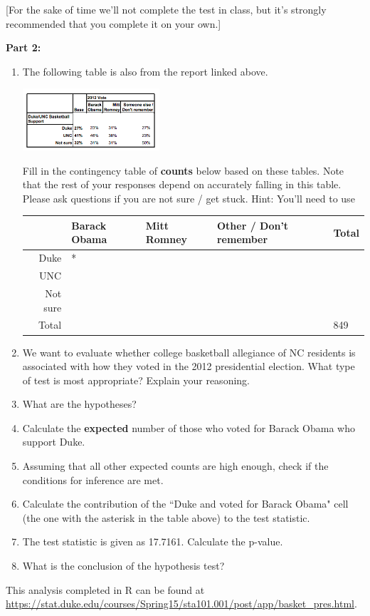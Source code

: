 \documentclass[11pt]{article}
\begin{document}
[For the sake of time we'll not complete the test in class, but it's strongly recommended that you complete it on your own.]

\textbf{Part 2:}

\begin{enumerate}[resume]

\item The following table is also from the report linked above. 

\begin{center}
\includegraphics[width=0.4\textwidth]{pp_basket_pres}
\end{center}

Fill in the contingency table of \textbf{counts} below based on these tables. Note that the rest of your responses depend on accurately falling in this table. Please ask questions if you are not sure / get stuck. Hint: You'll need to use

\begin{center}
\begin{tabular}{r | l | l | l | l}
				& Barack Obama	& Mitt Romney	& Other / Don't remember	& Total \\
\hline
\hline
Duke			& *				& 			&					&  \\
\hline
UNC				& 				& 			& 					&  \\
\hline
Not sure			& 				& 			& 					&  \\
\hline
\hline
Total				& 				& 			& 					& 849 \\
\end{tabular}
\end{center}

\item We want to evaluate whether college basketball allegiance of NC residents is associated with how they voted in the 2012 presidential election. What type of test is most appropriate? Explain your reasoning.

\item What are the hypotheses?

\item Calculate the \textbf{expected} number of those who voted for Barack Obama who support Duke.

\item Assuming that all other expected counts are high enough, check if the conditions for inference are met.

\item Calculate the contribution of the ``Duke and voted for Barack Obama" cell (the one with the asterisk in the table above) to the test statistic.

\item The test statistic is given as 17.7161. Calculate the p-value.

\item What is the conclusion of the hypothesis test?

\end{enumerate}

This analysis completed in R can be found at \url{https://stat.duke.edu/courses/Spring15/sta101.001/post/app/basket_pres.html}.

%
\end{document}
